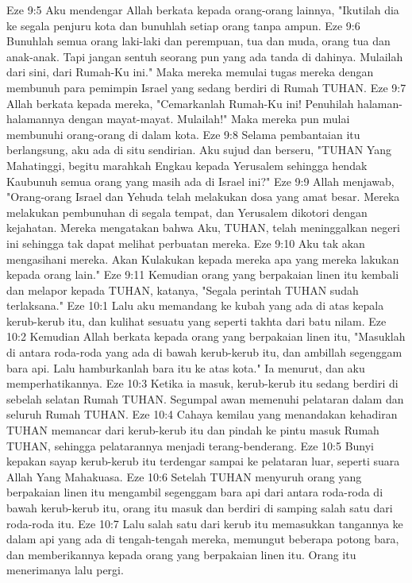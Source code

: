 Eze 9:5  Aku mendengar Allah berkata kepada orang-orang lainnya, "Ikutilah dia ke segala penjuru kota dan bunuhlah setiap orang tanpa ampun.
Eze 9:6  Bunuhlah semua orang laki-laki dan perempuan, tua dan muda, orang tua dan anak-anak. Tapi jangan sentuh seorang pun yang ada tanda di dahinya. Mulailah dari sini, dari Rumah-Ku ini." Maka mereka memulai tugas mereka dengan membunuh para pemimpin Israel yang sedang berdiri di Rumah TUHAN.
Eze 9:7  Allah berkata kepada mereka, "Cemarkanlah Rumah-Ku ini! Penuhilah halaman-halamannya dengan mayat-mayat. Mulailah!" Maka mereka pun mulai membunuhi orang-orang di dalam kota.
Eze 9:8  Selama pembantaian itu berlangsung, aku ada di situ sendirian. Aku sujud dan berseru, "TUHAN Yang Mahatinggi, begitu marahkah Engkau kepada Yerusalem sehingga hendak Kaubunuh semua orang yang masih ada di Israel ini?"
Eze 9:9  Allah menjawab, "Orang-orang Israel dan Yehuda telah melakukan dosa yang amat besar. Mereka melakukan pembunuhan di segala tempat, dan Yerusalem dikotori dengan kejahatan. Mereka mengatakan bahwa Aku, TUHAN, telah meninggalkan negeri ini sehingga tak dapat melihat perbuatan mereka.
Eze 9:10  Aku tak akan mengasihani mereka. Akan Kulakukan kepada mereka apa yang mereka lakukan kepada orang lain."
Eze 9:11  Kemudian orang yang berpakaian linen itu kembali dan melapor kepada TUHAN, katanya, "Segala perintah TUHAN sudah terlaksana."
Eze 10:1  Lalu aku memandang ke kubah yang ada di atas kepala kerub-kerub itu, dan kulihat sesuatu yang seperti takhta dari batu nilam.
Eze 10:2  Kemudian Allah berkata kepada orang yang berpakaian linen itu, "Masuklah di antara roda-roda yang ada di bawah kerub-kerub itu, dan ambillah segenggam bara api. Lalu hamburkanlah bara itu ke atas kota." Ia menurut, dan aku memperhatikannya.
Eze 10:3  Ketika ia masuk, kerub-kerub itu sedang berdiri di sebelah selatan Rumah TUHAN. Segumpal awan memenuhi pelataran dalam dan seluruh Rumah TUHAN.
Eze 10:4  Cahaya kemilau yang menandakan kehadiran TUHAN memancar dari kerub-kerub itu dan pindah ke pintu masuk Rumah TUHAN, sehingga pelatarannya menjadi terang-benderang.
Eze 10:5  Bunyi kepakan sayap kerub-kerub itu terdengar sampai ke pelataran luar, seperti suara Allah Yang Mahakuasa.
Eze 10:6  Setelah TUHAN menyuruh orang yang berpakaian linen itu mengambil segenggam bara api dari antara roda-roda di bawah kerub-kerub itu, orang itu masuk dan berdiri di samping salah satu dari roda-roda itu.
Eze 10:7  Lalu salah satu dari kerub itu memasukkan tangannya ke dalam api yang ada di tengah-tengah mereka, memungut beberapa potong bara, dan memberikannya kepada orang yang berpakaian linen itu. Orang itu menerimanya lalu pergi.
